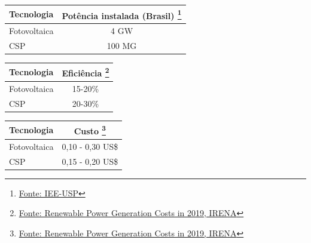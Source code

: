\documentclass[12pt,notheorems,hyperref={pdfauthor=Professor Rafael Nardi}]{beamer}
\begin{document}
\begin{frame}%

	\begin{table}
		\begin{tabular}{lc}
			\toprule
			Tecnologia & Potência instalada (Brasil) \footnote{\href{https://www.iee.usp.br/}{Fonte: IEE-USP}}\\
			\midrule
			Fotovoltaica & 4 GW  \\
			CSP &  100 MG  \\
			\bottomrule
		\end{tabular}		
		
	\end{table}
	
\end{frame}

\begin{frame}%

	\begin{table} 
		\begin{tabular}{lc}
			\toprule
			Tecnologia & Eficiência  \footnote{\href{https://resources.solarbusinesshub.com/solar-industry-reports/item/renewable-power-generation-costs-in-2019}{Fonte: Renewable Power Generation Costs in 2019, IRENA}}\\
			\midrule
			Fotovoltaica & 15-20\% \\
			CSP & 20-30\% \\
			\bottomrule
		\end{tabular}
	\end{table}
	
\end{frame}

\begin{frame}%

	\begin{table}
		\begin{tabular}{lc}
			\toprule
			Tecnologia & Custo \footnote{\href{https://resources.solarbusinesshub.com/solar-industry-reports/item/renewable-power-generation-costs-in-2019}{Fonte: Renewable Power Generation Costs in 2019, IRENA}}\\
			\midrule
			Fotovoltaica & 0,10 - 0,30 US\$ \\
			CSP & 0,15 - 0,20 US\$ \\
			\bottomrule
		\end{tabular}
	\end{table}
	
\end{frame}
\end{document}
